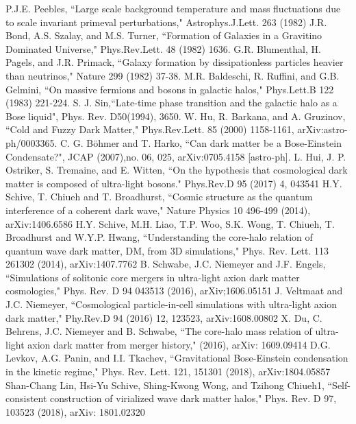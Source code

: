 \documentclass[aps,prl,twocolumn]{revtex4}
\begin{document}
\begin{thebibliography}{100}
 P.J.E. Peebles, ``Large scale background temperature and mass fluctuations due to scale invariant primeval perturbations," Astrophys.J.Lett. 263 (1982)
 J.R. Bond, A.S. Szalay, and M.S. Turner, ``Formation of Galaxies in a Gravitino Dominated Universe," Phys.Rev.Lett. 48 (1982) 1636.
 G.R. Blumenthal, H. Pagels, and J.R. Primack, ``Galaxy formation by dissipationless particles heavier than neutrinos," Nature 299 (1982) 37-38.
 M.R. Baldeschi, R. Ruffini, and G.B. Gelmini, ``On massive fermions and bosons in galactic halos," Phys.Lett.B 122 (1983) 221-224.
 S. J. Sin,``Late-time phase transition and the galactic halo as a Bose liquid", Phys. Rev. D50(1994), 3650.  
 W. Hu, R. Barkana, and A. Gruzinov, ``Cold and Fuzzy Dark Matter," Phys.Rev.Lett. 85 (2000) 1158-1161, arXiv:astro-ph/0003365.
   C. G. B\"{o}hmer and T. Harko, ``Can dark matter be a Bose-Einstein Condensate?", JCAP (2007),no. 06, 025, arXiv:0705.4158 [astro-ph].
L. Hui, J. P. Ostriker, S. Tremaine, and E. Witten, ``On the hypothesis that cosmological dark matter is composed of ultra-light bosons." Phys.Rev.D 95 (2017) 4, 043541 
 H.Y. Schive, T. Chiueh and T. Broadhurst, ``Cosmic structure as the quantum interference of a coherent dark wave," Nature Physics 10 496-499 (2014), arXiv:1406.6586
 H.Y. Schive, M.H. Liao, T.P. Woo, S.K. Wong, T. Chiueh, T. Broadhurst and W.Y.P. Hwang, ``Understanding the core-halo relation of quantum wave dark matter, DM, from 3D simulations," Phys. Rev. Lett. 113 261302 (2014), arXiv:1407.7762
 B. Schwabe, J.C. Niemeyer and J.F. Engels, ``Simulations of solitonic core mergers in ultra-light axion dark matter cosmologies," Phys. Rev. D 94 043513 (2016), arXiv;1606.05151
J. Veltmaat and J.C. Niemeyer, ``Cosmological particle-in-cell simulations with ultra-light axion dark matter," Phy.Rev.D 94 (2016) 12, 123523, arXiv:1608.00802
 X. Du, C. Behrens, J.C. Niemeyer and B. Schwabe, ``The core-halo mass relation of ultra-light axion dark matter from merger history," (2016),  arXiv: 1609.09414
 D.G. Levkov, A.G. Panin, and I.I. Tkachev, ``Gravitational Bose-Einstein condensation in the kinetic regime," Phys. Rev. Lett. 121, 151301 (2018), arXiv:1804.05857
 Shan-Chang Lin, Hsi-Yu Schive, Shing-Kwong Wong, and Tzihong Chiueh1, ``Self-consistent construction of virialized wave dark matter halos," Phys. Rev. D 97, 103523 (2018), arXiv: 1801.02320

\end{thebibliography}
\end{document}
